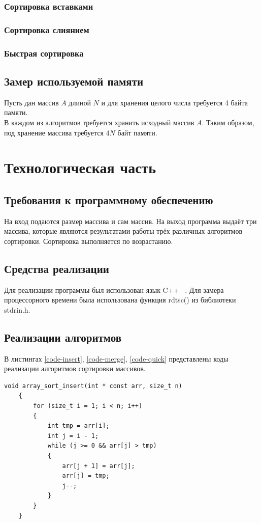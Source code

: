 \documentclass[12pt, a4paper]{report}
\begin{document}
	\subsection{Сортировка вставками}
	
	\subsection{Сортировка слиянием}
	
	\subsection{Быстрая сортировка}

	\section{Замер используемой памяти}
	Пусть дан массив $A$ длиной $N$ и для хранения целого числа требуется 4 байта памяти.\\
	В каждом из алгоритмов требуется хранить исходный массив $A$. Таким образом, под хранение массива требуется $4N$ байт памяти.\\
	
	\chapter{Технологическая часть}
	\section{Требования к программному обеспечению}
	На вход подаются размер массива и сам массив. На выход программа выдаёт три массива, которые являются результатами работы трёх различных алгоритмов сортировки. Сортировка выполняется по возрастанию.
	\section{Средства реализации}
	Для реализации программы был использован язык C++ ~\cite{CPP}. Для замера процессорного времени была использована функция rdtsc() из библиотеки stdrin.h.
	\section{Реализации алгоритмов}
	В листингах \ref{code-insert}, \ref{code-merge}, \ref{code-quick} представлены коды реализации алгоритмов сортировки массивов.
	\begin{lstlisting}[label=code-insert,caption=Сортировка вставками]
	void array_sort_insert(int * const arr, size_t n)
	{
		for (size_t i = 1; i < n; i++)
		{
			int tmp = arr[i];
			int j = i - 1;
			while (j >= 0 && arr[j] > tmp)
			{
				arr[j + 1] = arr[j];
				arr[j] = tmp;
				j--;
			}
		}
	}
	\end{lstlisting}
\end{document}
